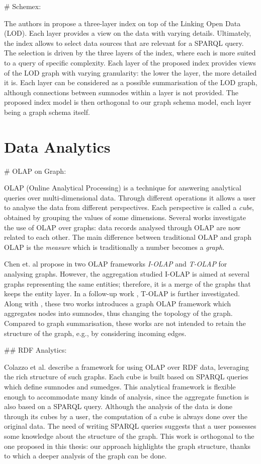 \# Schemex:

The authors in \cite{konrath:jws:2012} propose a three-layer index on top of the Linking Open Data (LOD). Each layer provides a view on the data with varying details. Ultimately, the index allows to select data sources that are relevant for a SPARQL query. The selection is driven by the three layers of the index, where each is more suited to a query of specific complexity.
Each layer of the proposed index provides views of the LOD graph with varying granularity: the lower the layer, the more detailed it is. Each layer can be considered as a possible summarisation of the LOD graph, although connections between sumnodes within a layer is not provided. The proposed index model is then orthogonal to our graph schema model, each layer being a graph schema itself.

\section{Data Analytics}

\# OLAP on Graph:

OLAP (Online Analytical Processing) is a technique for answering analytical queries over multi-dimensional data. Through different operations it allows a user to analyse the data from different perspectives. Each perspective is called a \emph{cube}, obtained by grouping the values of some dimensions. Several works investigate the use of OLAP over graphs: data records analysed through OLAP are now related to each other. The main difference between traditional OLAP and graph OLAP is the \emph{measure} which is traditionally a number becomes a \emph{graph}.

Chen et. al propose in \cite{chen:icdm:2008} two OLAP frameworks \emph{I-OLAP} and \emph{T-OLAP} for analysing graphs. However, the aggregation studied I-OLAP is aimed at several graphs representing the same entities; therefore, it is a merge of the graphs that keeps the entity layer. In a follow-up work \cite{qu:dasfaa:2011}, T-OLAP is further investigated. Along with \cite{zhao:sigmod:2011}, these two works introduces a graph OLAP framework which aggregates nodes into sumnodes, thus changing the topology of the graph. Compared to graph summarisation, these works are not intended to retain the structure of the graph, e.g., by considering incoming edges.

\#\# RDF Analytics:

Colazzo et al. \cite{colazzo:www:2014} describe a framework for using OLAP over RDF data, leveraging the rich structure of such graphs. Each cube is built based on SPARQL queries which define sumnodes and sumedges. This analytical framework is flexible enough to accommodate many kinds of analysis, since the aggregate function is also based on a SPARQL query. Although the analysis of the data is done through its cubes by a user, the computation of a cube is always done over the original data. The need of writing SPARQL queries suggests that a user possesses some knowledge about the structure of the graph. This work is orthogonal to the one proposed in this thesis: our approach highlights the graph structure, thanks to which a deeper analysis of the graph can be done.

